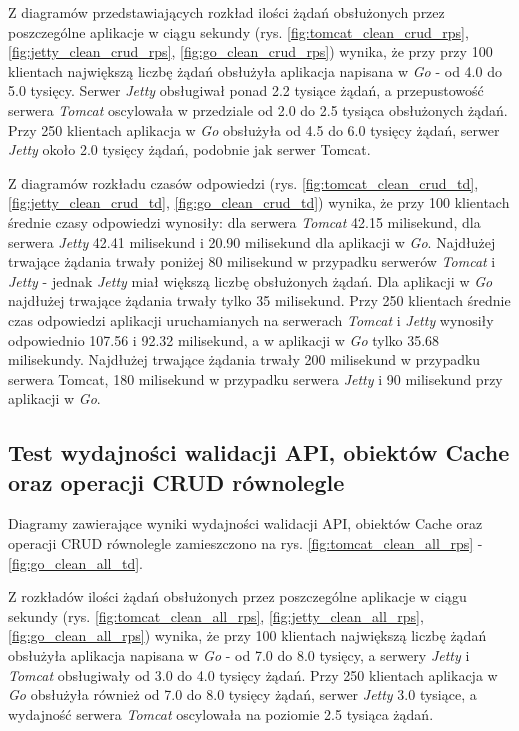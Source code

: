 Z diagramów przedstawiających rozkład ilości żądań obsłużonych przez poszczególne aplikacje w ciągu sekundy (rys. \ref{fig:tomcat_clean_crud_rps}, \ref{fig:jetty_clean_crud_rps}, \ref{fig:go_clean_crud_rps}) wynika, że przy przy 100 klientach największą liczbę żądań obsłużyła aplikacja napisana w \textsl{Go} - od 4.0 do 5.0 tysięcy. Serwer \textsl{Jetty} obsługiwał ponad 2.2 tysiące żądań, a przepustowość serwera \textsl{Tomcat} oscylowała w przedziale od 2.0 do 2.5 tysiąca obsłużonych żądań. Przy 250 klientach aplikacja w \textsl{Go} obsłużyła od 4.5 do 6.0 tysięcy żądań, serwer \textsl{Jetty} około 2.0 tysięcy żądań, podobnie jak serwer Tomcat.

Z diagramów rozkładu czasów odpowiedzi (rys. \ref{fig:tomcat_clean_crud_td}, \ref{fig:jetty_clean_crud_td}, \ref{fig:go_clean_crud_td}) wynika, że przy 100 klientach średnie czasy odpowiedzi wynosiły: dla serwera \textsl{Tomcat} 42.15  milisekund, dla serwera \textsl{Jetty} 42.41  milisekund i 20.90 milisekund dla aplikacji w \textsl{Go}.  Najdłużej trwające żądania trwały poniżej 80 milisekund w przypadku serwerów \textsl{Tomcat} i \textsl{Jetty} - jednak \textsl{Jetty} miał większą liczbę obsłużonych żądań. Dla aplikacji w \textsl{Go} najdłużej trwające żądania trwały tylko 35 milisekund. Przy 250 klientach średnie czas odpowiedzi aplikacji uruchamianych na serwerach \textsl{Tomcat} i \textsl{Jetty}  wynosiły  odpowiednio 107.56 i 92.32 milisekund, a w aplikacji w \textsl{Go} tylko 35.68 milisekundy. Najdłużej trwające żądania trwały 200 milisekund w przypadku serwera Tomcat, 180 milisekund w przypadku serwera \textsl{Jetty} i 90 milisekund przy aplikacji w \textsl{Go}. 

% 
\clearpage

\subsection{Test wydajności walidacji API, obiektów Cache oraz operacji CRUD równolegle}
Diagramy zawierające wyniki wydajności walidacji API, obiektów Cache oraz operacji CRUD równolegle zamieszczono na rys. \ref{fig:tomcat_clean_all_rps} - \ref{fig:go_clean_all_td}.                                                                  

Z rozkładów ilości żądań obsłużonych przez poszczególne aplikacje w ciągu sekundy (rys. \ref{fig:tomcat_clean_all_rps}, \ref{fig:jetty_clean_all_rps}, \ref{fig:go_clean_all_rps}) wynika, że przy 100 klientach największą liczbę żądań obsłużyła aplikacja napisana w \textsl{Go} - od 7.0 do 8.0 tysięcy, a serwery \textsl{Jetty} i \textsl{Tomcat} obsługiwały od 3.0 do 4.0  tysięcy żądań. Przy 250 klientach aplikacja w \textsl{Go} obsłużyła również od 7.0 do 8.0 tysięcy żądań, serwer \textsl{Jetty} 3.0 tysiące, a wydajność serwera \textsl{Tomcat} oscylowała na poziomie 2.5 tysiąca żądań. 
 
